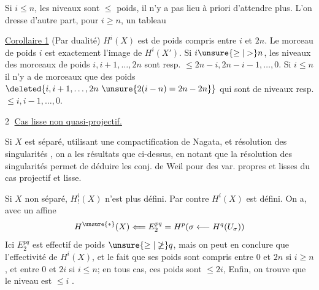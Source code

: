  Si $i\le n$, les niveaux sont  $\le$ poids, il n'y a pas lieu à priori d'attendre plus. L'on dresse d'autre part, pour $i\ge n$, un tableau


\uline{Corollaire 1} (Par dualité) $H^i(X)$ est de poids compris entre $i$ et $2n$. Le morceau  de poids $i$ est exactement l'image de $H^i(X')$. Si $i\unsure{\ge|>}n$, les niveaux des morceaux de poids $i,i+1,\ldots,2n$ sont resp. $\le2n-i,2n-i-1,\ldots,0$. Si $i\le n$ il n'y a de morceaux  que des poids
$\deleted{i,i+1,\ldots,2n\ \unsure{2(i-n)=2n-2n}}$ 
qui sont de niveaux resp. $\le i,i-1,\ldots,0$.

\textcircled{2} \uline{Cas  lisse non quasi-projectif.}

Si $X$ est séparé, utilisant une compactification de Nagata, et résolution des singularités , on a les  résultats que ci-dessus, en notant que la résolution des singularités permet de déduire les conj. de Weil pour des var. propres et lisses du cas projectif et lisse.

Si $X$ non séparé, $H^i_!(X)$ n'est plus défini. Par contre $H^i(X)$ est défini. On a, avec un  affine
\[
H^{\unsure{*}}(X)\Longleftarrow E^{pq}_2=H^p(\sigma\longleftarrow H^q(U_\sigma))
\]
Ici $E^{pq}_2$ est effectif de poids $\unsure{\ge|\not\ge}q$, mais   on peut en conclure que l'effectivité de $H^i(X)$, et le fait que ses poids sont compris entre $0$ et $2n$ si $i\ge n$, et entre $0$ et $2i$ si $i\le n$; en tous cas, ces poids sont $\le2i$,  Enfin, on trouve que le niveau est $\le i$ .

